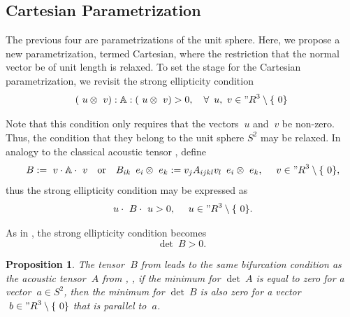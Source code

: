 \documentclass[12pt]{article}
\newtheorem{proposition}{Proposition}
\numberwithin{equation}{section}
\begin{document}
\subsection{Cartesian Parametrization}
\label{subsec:Cartesian}

The previous four are parametrizations of the unit sphere. Here, we
propose a new parametrization, termed Cartesian, where the restriction
that the normal vector be of unit length is relaxed.  To set the stage
for the Cartesian parametrization, we revisit the strong ellipticity
condition
\begin{equation}
  (~u \otimes ~v) : \mathbb{A} : (~u \otimes ~v) > 0,
  \quad
  \forall \, ~u, ~v \in {"R}^3 \setminus \{~0\}
\end{equation}

Note that this condition only requires that the vectors $~u$ and $~v
$ be non-zero. Thus, the condition that they belong to the unit sphere
$S^2$ may be relaxed. In analogy to the classical acoustic tensor
, define
\begin{equation} \label{eq:Cartesian-acoustic-tensor}
  ~B := ~v \cdot \mathbb{A} \cdot ~v
  \quad \text{or} \quad
  B_{ik} \, ~e_i \otimes ~e_k := v_j A_{ijkl} v_l  \, ~e_i \otimes ~e_k,
  \quad
  ~v \in {"R}^3 \setminus \{~0\},
\end{equation}
thus the strong ellipticity condition may be expressed as
\begin{equation} \label{eq:Cartesian-acoustic-ellipticity}
  ~u \cdot ~B \cdot ~u > 0,
  \quad
  ~u \in {"R}^3 \setminus \{~0\}.
\end{equation}

As in , the strong ellipticity
condition becomes
\begin{equation} \label{Cartesian-acoustic-determinant}
  \det ~B > 0.
\end{equation}

\begin{proposition}
  The tensor $~B$ from  leads to
  the same bifurcation condition as the acoustic tensor $~A$ from
  , \ie, if the minimum for $\det ~A$ is
  equal to zero for a vector $~a \in S^2$, then the minimum for $\det
  ~B$ is also zero for a vector $~b \in {"R}^3 \setminus \{~0\}$ that
  is parallel to $~a$.
\end{proposition}
\end{document}
